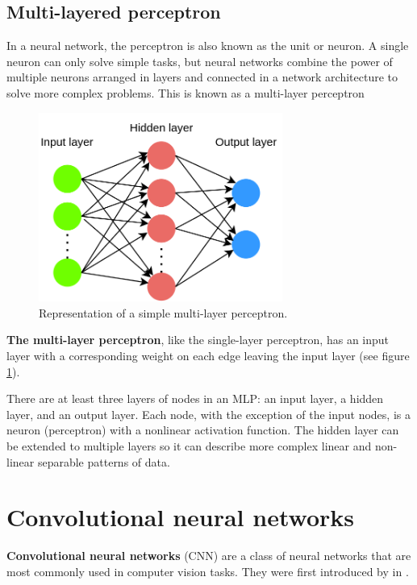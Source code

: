 \documentclass{report}[12pt, a4paper]
\begin{document}
\subsection{Multi-layered perceptron}

In a neural network, the perceptron is also known as the unit or neuron. A single neuron can only solve simple tasks, but neural networks combine the power of multiple neurons arranged in layers and connected in a network architecture to solve more complex problems. This is known as a multi-layer perceptron

\begin{figure}[htp]
    \centering
    \includegraphics[width=8cm]{mlp_diagram}
    \caption{Representation of a simple multi-layer perceptron.}
    \label{fig:mlp_diagram}
\end{figure}

\textbf{The multi-layer perceptron}, like the single-layer perceptron, has an input layer with a corresponding weight on each edge leaving the input layer (see figure \ref{fig:mlp_diagram}).

There are at least three layers of nodes in an MLP: an input layer, a hidden layer, and an output layer. Each node, with the exception of the input nodes, is a neuron (perceptron) with a nonlinear activation function. The hidden layer can be extended to multiple layers so it can describe more complex linear and non-linear separable patterns of data.

\section{Convolutional neural networks}

\textbf{Convolutional neural networks} (CNN) are a class of neural networks that are most commonly used in computer vision tasks. They were first introduced by \citeauthor{lenet_paper} in \cite{lenet_paper}.
\end{document}
